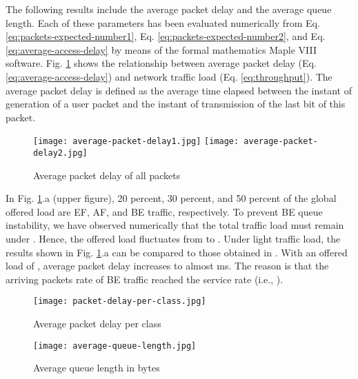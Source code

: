 \documentclass[a4paper,10pt]{IEEEtran}
\begin{document}
The following results include the average packet delay and the
average queue length. Each of these parameters has been evaluated
numerically from Eq. \ref{eq:packets-expected-number1}, Eq.
\ref{eq:packets-expected-number2}, and Eq.
\ref{eq:average-access-delay} by means of the formal mathematics
Maple VIII software. Fig. \ref{results1-2} shows the relationship
between average packet delay (Eq. \ref{eq:average-access-delay}) and
network traffic load (Eq. \ref{eq:throughput}). The average packet
delay is defined as the average time elapsed between the instant of
generation of a user packet and the instant of transmission of the
last bit of this packet.
\begin{figure}
\centering
\texttt{[image: average-packet-delay1.jpg]}
\texttt{[image: average-packet-delay2.jpg]}
\caption{Average packet delay of all packets}\label{results1-2}
\end{figure}

In Fig. \ref{results1-2}.a (upper figure), 20 percent, 30 percent,
and 50 percent of the global offered load are EF, AF, and BE
traffic, respectively. To prevent BE queue instability, we have
observed numerically that the total traffic load must remain under
. Hence, the offered load fluctuates from  to .
Under light traffic load, the results shown in Fig.
\ref{results1-2}.a can be compared to those obtained in
\cite{Luo:2005}. With an offered load of , average packet delay
increases to almost  ms. The reason is that the arriving packets
rate of BE traffic reached the service rate (i.e., ).
\begin{figure}[!h]
\centering
\texttt{[image: packet-delay-per-class.jpg]}
\caption{Average packet delay per class} \label{results3}
\end{figure}
\begin{figure}
\centering
\texttt{[image: average-queue-length.jpg]}
\caption{Average queue length in bytes} \label{results4}
\end{figure}
\end{document}
